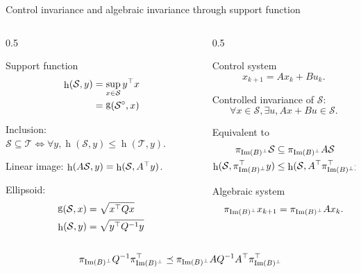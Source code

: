 \documentclass[9pt,notes=hide]{beamer}
\newcommand{\piB}{\pi_{\Image(B)^\perp}}
\newcommand{\piBTr}{\pi_{\Image(B)^\perp}^\Tr}
\DeclareMathOperator{\gauge}{g}
\DeclareMathOperator{\suppfun}{h}
\begin{document}
\begin{frame}{Control invariance and algebraic invariance through support function}
  \begin{columns}
    \begin{column}{0.5\textwidth}
      \begin{block}{\alert{Support} function}
        \begin{align*}
          \suppfun(\mathcal{S}, y) & = \sup_{x \in \mathcal{S}} y^\Tr x\\
          & = \gauge(\polar{\mathcal{S}}, x)
        \end{align*}

        Inclusion: $\mathcal{S} \subseteq \mathcal{T} \Leftrightarrow \forall y, \suppfun(\mathcal{S}, y) \le \suppfun(\mathcal{T}, y)$.

        Linear \alert{image}: $\suppfun(A\mathcal{S}, y) = \suppfun(\mathcal{S}, A^\Tr y)$.

        \alert{Ellipsoid}:
        \begin{align*}
          \gauge(\mathcal{S}, x) & = \sqrt{x^\Tr Q x}\\
          \suppfun(\mathcal{S}, y) & = \sqrt{y^\Tr Q^{-1} y}
        \end{align*}
      \end{block}
    \end{column}
    \begin{column}{0.5\textwidth}
      \begin{block}{\alert{Control} system}
        \[ x_{k+1} = Ax_k + Bu_k. \]
      \end{block}

      Controlled invariance of $\mathcal{S}$:
      \[ \forall x \in \mathcal{S}, \exists u, A x + B u \in \mathcal{S}. \]

      \vspace{-1em}

      Equivalent to
      \begin{align*}
        \piB{} \mathcal{S} & \subseteq \piB{} A \mathcal{S}\\
        \suppfun(\mathcal{S}, \piBTr{} y) & \le \suppfun(\mathcal{S}, A^\Tr \piBTr{} y)
      \end{align*}

      \begin{block}{\alert{Algebraic} system}
        \[ \piB{} x_{k+1} = \piB{} Ax_k. \]
      \end{block}
    \end{column}
  \end{columns}
  \[
    \piB{}Q^{-1}\piBTr{} \preceq  \piB{} A Q^{-1} A^\Tr \piBTr{}
  \]
\end{frame}
\end{document}
